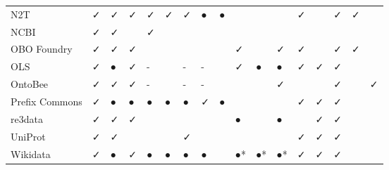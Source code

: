 \begin{table}
\begin{tabular}{lllllllllllllllll}
            N2T &              ✓ &        ✓ &     ✓ &          ✓ &          ✓ &        ✓ &              ● &             ● &         &         &         &                          ✓ &        &               ✓ &        ✓ &        \\
           NCBI &              ✓ &        ✓ &       &          ✓ &            &          &                &               &         &         &         &                            &        &                 &          &        \\
    OBO Foundry &              ✓ &        ✓ &     ✓ &            &            &          &                &               &       ✓ &         &       ✓ &                          ✓ &        &               ✓ &        ✓ &        \\
            OLS &              ✓ &        ● &     ✓ &          - &            &        - &              - &               &       ✓ &       ● &       ● &                          ✓ &      ✓ &               ✓ &          &        \\
        OntoBee &              ✓ &        ✓ &     ✓ &          - &            &        - &              - &               &         &         &       ✓ &                            &        &               ✓ &          &      ✓ \\
 Prefix Commons &              ✓ &        ● &     ● &          ● &          ● &        ● &              ✓ &             ● &         &         &         &                          ✓ &      ✓ &               ✓ &          &        \\
        re3data &              ✓ &        ✓ &     ✓ &            &            &          &                &               &       ● &         &       ● &                            &      ✓ &               ✓ &          &        \\
        UniProt &              ✓ &        ✓ &       &            &            &        ✓ &                &               &         &         &         &                          ✓ &      ✓ &               ✓ &          &        \\
       Wikidata &              ✓ &        ● &     ✓ &          ● &          ● &        ● &              ● &               &      ●* &      ●* &      ●* &                          ✓ &      ✓ &               ✓ &          &        \\
\bottomrule
\end{tabular}
\end{table}
